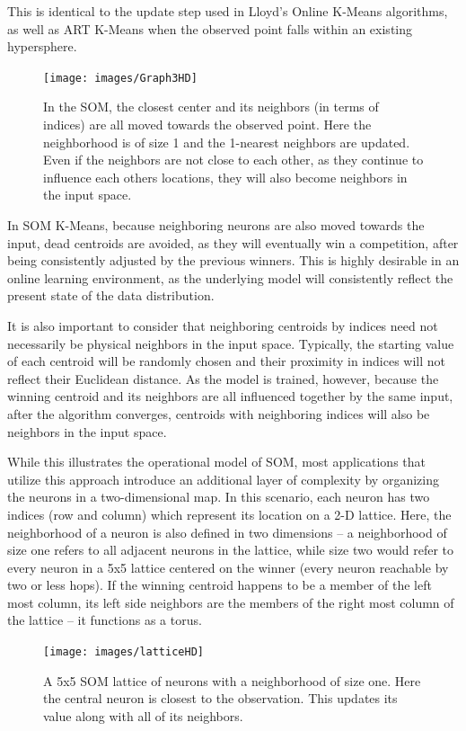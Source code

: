 \documentclass{l4proj}
\begin{document}
This is identical to the update step used in Lloyd's Online K-Means algorithms, as well as ART K-Means when the observed point falls within an existing hypersphere.

\begin{figure}[H]
	\centering
    \label{somGraph}
    \texttt{[image: images/Graph3HD]}
    \caption{In the SOM, the closest center and its neighbors (in terms of indices) are all moved towards the observed point. Here the neighborhood is of size 1 and the 1-nearest neighbors are updated. Even if the neighbors are not close to each other, as they continue to influence each others locations, they will also become neighbors in the input space.} 
\end{figure}

In SOM K-Means, because neighboring neurons are also moved towards the input, dead centroids are avoided, as they will eventually win a competition, after being consistently adjusted by the previous winners. This is highly desirable in an online learning environment, as the underlying model will consistently reflect the present state of the data distribution.

It is also important to consider that neighboring centroids by indices need not necessarily be physical neighbors in the input space. Typically, the starting value of each centroid will be randomly chosen and their proximity in indices will not reflect their Euclidean distance. As the model is trained, however, because the winning centroid and its neighbors are all influenced together by the same input, after the algorithm converges, centroids with neighboring indices will also be neighbors in the input space.

While this illustrates the operational model of SOM, most applications that utilize this approach introduce an additional layer of complexity by organizing the neurons in a two-dimensional map. In this scenario, each neuron has two indices (row and column) which represent its location on a 2-D lattice. Here, the neighborhood of a neuron is also defined in two dimensions -- a neighborhood of size one refers to all adjacent neurons in the lattice, while size two would refer to every neuron in a 5x5 lattice centered on the winner (every neuron reachable by two or less hops). If the winning centroid happens to be a member of the left most column, its left side neighbors are the members of the right most column of the lattice -- it functions as a torus.

\begin{figure}[H]
	\centering
    \label{somLattice}
    \texttt{[image: images/latticeHD]}
    \caption{A 5x5 SOM lattice of neurons with a neighborhood of size one. Here the central neuron is closest to the observation. This updates its value along with all of its neighbors.} 
\end{figure}
\end{document}
